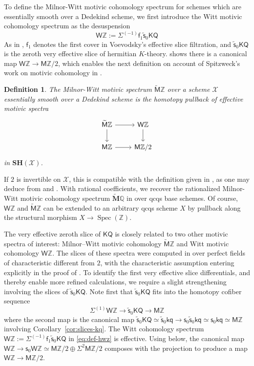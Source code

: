 \documentclass[11pt,hyp,english]{article}
\newcommand{\Z}{\mathbb{Z}}
\newcommand{\Q}{\mathbb{Q}}
\newcommand{\KQ}{\mathsf{KQ}}
\newcommand{\kq}{\mathsf{kq}}
\newcommand{\MZ}{\mathsf{M}\Z}
\newcommand{\HZ}{\mathsf{M}\Z}
\newcommand{\cHZ}{\wt{{\mathsf{M}}}{\Z}}
\newcommand{\cHQ}{{\wt{\mathbf{M}}}{\Q}}
\newcommand{\HWZ}{\mathsf{W}\Z}
\newcommand{\SH}{\mathbf{SH}}
\newcommand{\Spec}{\operatorname{Spec}}
\newcommand{\wt}[1]{\widetilde{#1}}
\newcommand{\s}{\mathsf{s}}
\newcommand{\vs}{\tilde{\mathsf{s}}}
\newcommand{\f}{\mathsf{f}}
\newtheorem{defn}[theorem]{Definition}
\theoremstyle{definition}
\begin{document}
To define the Milnor-Witt motivic cohomology spectrum for schemes which are 
essentially smooth over a Dedekind scheme, 
we first introduce the Witt motivic cohomology spectrum as the desuspension 
\begin{equation}
\label{eq:def-hwz}
\HWZ:= \Sigma^{(-1)}\f_1\vs_0\KQ
\end{equation}
As in , 
$\f_1$ denotes the first cover in Voevodsky's effective slice filtration, 
and $\vs_0\KQ$ is the zeroth very effective slice of hermitian $K$-theory. 
 shows there is a canonical map $\HWZ\to\MZ/2$, 
which enables the next definition on account of 
Spitzweck's work on motivic cohomology in \cite{zbMATH07015021}.

\begin{defn}
\label{def:mwz}
The Milnor-Witt motivic spectrum $\cHZ$ over a scheme $\mathcal{X}$ essentially smooth over a Dedekind scheme is the homotopy pullback of 
effective motivic spectra
\[ 
\begin{tikzcd}
\cHZ \ar[r] \ar[d] & \HWZ \ar[d] \\
\MZ \ar[r] & \MZ/2
\end{tikzcd}
\]
in $\SH(\mathcal{X})$.
\end{defn}

If $2$ is invertible on $\mathcal{X}$, 
this is compatible with the definition given in \cite{bachmann.etaperiodic-dedekind}, 
as one may deduce from  and \cite[Theorem 10.22]{bem.kglslices}.
With rational coefficients, 
we recover the rationalized Milnor-Witt motivic cohomology 
spectrum $\cHQ$ in \cite[Def.~5.18, 6.1]{dfjk} over qcqs base schemes.
Of course, 
$\HWZ$ and $\cHZ$ can be extended to an arbitrary qcqs scheme $X$ by pullback 
along the structural morphism $X\to \Spec(\Z)$. 
\vspace{0.1in}

The very effective zeroth slice of $\KQ$ is closely related to two other motivic spectra of interest: Milnor–Witt motivic cohomology $\cHZ$ and Witt motivic cohomology $\HWZ$. The slices of these spectra were computed in \cite[§6]{Bachmann} over perfect fields of characteristic different from $2$, with the characteristic assumption entering explicitly in the proof of \cite[Lemma 20]{Bachmann}. To identify the first very effective slice differentials, and thereby enable more refined calculations, we require a slight strengthening involving the slices of $\vs_0\KQ$. Note first that $\vs_0\KQ$ fits into the homotopy cofiber sequence
\begin{equation}
\Sigma^{(1)}\HWZ \to \vs_0\KQ  \to \HZ \label{triangle2}
\end{equation}
where the second map is the canonical map
$\vs_0\KQ\simeq \vs_0\kq \to \s_0\vs_0\kq\simeq \s_0\kq\simeq \MZ$ involving Corollary~\ref{cor:slices-kq}.
The Witt cohomology spectrum $\HWZ:= \Sigma^{(-1)}\f_1\vs_0\KQ$ in \eqref{eq:def-hwz} is effective.
Using  below, 
the canonical map $\HWZ\to \s_0\HWZ \simeq \MZ/2\oplus \Sigma^2\MZ/2$ 
composes with the projection to produce a map $\HWZ\to \MZ/2$.
\end{document}
